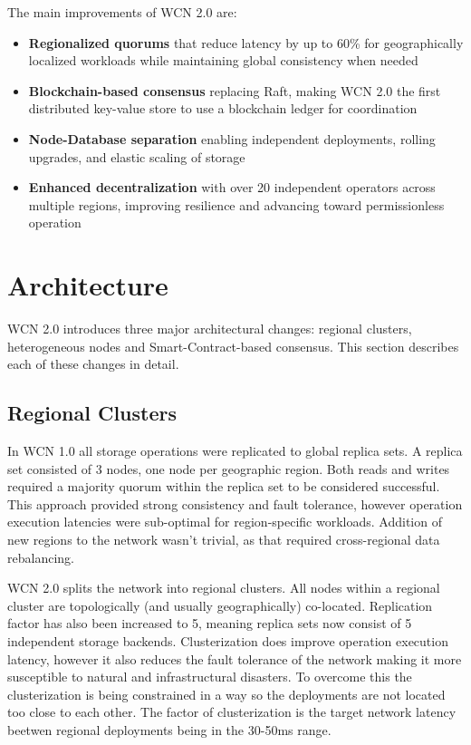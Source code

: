 \documentclass[10pt,twocolumn]{article}
\begin{document}
The main improvements of WCN 2.0 are:
\begin{itemize}
    \item \textbf{Regionalized quorums} that reduce latency by up to 60\% for geographically localized workloads while maintaining global consistency when needed
    \item \textbf{Blockchain-based consensus} replacing Raft, making WCN 2.0 the first distributed key-value store to use a blockchain ledger for coordination
    \item \textbf{Node-Database separation} enabling independent deployments, rolling upgrades, and elastic scaling of storage
    \item \textbf{Enhanced decentralization} with over 20 independent operators across multiple regions, improving resilience and advancing toward permissionless operation
\end{itemize}

\section{Architecture}

WCN 2.0 introduces three major architectural changes: regional clusters, heterogeneous nodes and Smart-Contract-based consensus. This section describes each of these changes in detail.

\subsection{Regional Clusters}

In WCN 1.0 all storage operations were replicated to global replica sets. A replica set consisted of 3 nodes, one node per geographic region.
Both reads and writes required a majority quorum within the replica set to be considered successful.
This approach provided strong consistency and fault tolerance, however operation execution latencies were sub-optimal for region-specific workloads.
Addition of new regions to the network wasn't trivial, as that required cross-regional data rebalancing.

WCN 2.0 splits the network into regional clusters. All nodes within a regional cluster are topologically (and usually geographically) co-located.
Replication factor has also been increased to 5, meaning replica sets now consist of 5 independent storage backends.
Clusterization does improve operation execution latency, however it also reduces the fault tolerance of the network making it more susceptible to natural and infrastructural disasters.
To overcome this the clusterization is being constrained in a way so the deployments are not located too close to each other.
The factor of clusterization is the target network latency beetwen regional deployments being in the 30-50ms range.
\end{document}
